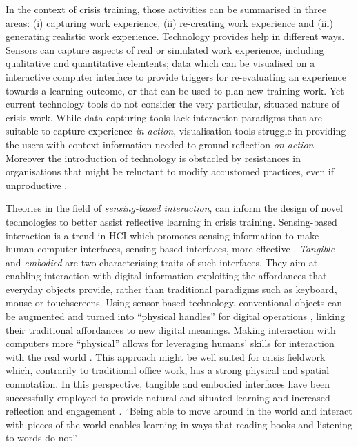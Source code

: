 In the context of crisis training, those activities can be summarised in three areas: (i) capturing work experience, (ii) re-creating work experience and (iii) generating realistic work experience. Technology provides help in different ways. Sensors can capture aspects of real or simulated work experience, including qualitative and quantitative elemtents; data which can be visualised on a interactive computer interface to provide triggers for re-evaluating an experience towards a learning outcome, or that can be used to plan new training work. Yet current technology tools do not consider the very particular, situated nature of crisis work. While data capturing tools lack interaction paradigms that are suitable to capture experience \emph{in-action}, visualisation tools struggle in providing the users with context information needed to ground  reflection \emph{on-action}. Moreover the introduction of technology is obstacled by resistances in organisations that might be reluctant to modify accustomed practices, even if unproductive \autocite{JCCM:JCCM15}.

Theories in the field of \emph{sensing-based interaction}, can inform the design of novel technologies to better assist reflective learning in crisis training. Sensing-based interaction is a trend in HCI which promotes sensing information to make human-computer interfaces, sensing-based interfaces, more effective \autocite{Zhai:2005jm}. \emph{Tangible} and \emph{embodied} \autocite{Dourish:2001vc} are two characterising traits of such interfaces. They aim at enabling interaction with digital information exploiting the affordances that everyday objects provide, rather than traditional paradigms such as keyboard, mouse or touchscreens. Using sensor-based technology, conventional objects can be augmented and turned into ``physical handles'' for digital operations \autocite{Ishii:1997ur}, linking their traditional affordances to new digital meanings. Making interaction with computers more ``physical'' allows for leveraging humans' skills for interaction with the real world \autocite{Shaer:2009fx}. This approach might be well suited for crisis fieldwork which, contrarily to traditional office work, has a strong physical and spatial connotation. In this perspective, tangible and embodied interfaces have been successfully employed to provide natural \autocite{Terrenghi:2005gq} and situated \autocite{Klemmer:2006ez} learning and increased reflection and engagement \autocite{Rogers:2006te}. ``Being able to move around in the world and interact with pieces of the world enables learning in ways that reading books and listening to words do not''. \autocite{Klemmer:2006ez}

